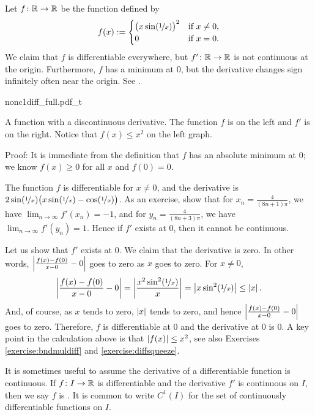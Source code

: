 \begin{example} \label{baddifffunc:example}
Let $f \colon {\mathbb{R}} \to {\mathbb{R}}$ be the function defined by
\begin{equation*}
f(x) :=
\begin{cases}
{\bigl( x \sin(\nicefrac{1}{x}) \bigr)}^2 & \text{if } x \not= 0, \\
0 & \text{if } x = 0.
\end{cases}
\end{equation*}
We claim that $f$ is differentiable everywhere, but
$f' \colon {\mathbb{R}} \to {\mathbb{R}}$ is not continuous at
the origin.  Furthermore, $f$ has a minimum at $0$, but the derivative
changes sign infinitely often near the origin.
See .
\begin{myfigureht}
{nonc1diff_full.pdf_t}
\caption{A function with a discontinuous derivative. The function $f$ is on the left
and $f'$ is on the right.  Notice that $f(x) \leq x^2$ on the left graph.\label{fig:nonc1diff}}
\end{myfigureht}

Proof: It is immediate from the definition that $f$ has an absolute
minimum at $0$; we know $f(x) \geq 0$ for all $x$ and $f(0) = 0$.

The function $f$ is differentiable for $x\not=0$,
and
the derivative 
is $2 \sin (\nicefrac{1}{x}) \bigl( x \sin (\nicefrac{1}{x}) -
\cos(\nicefrac{1}{x}) \bigr)$.
As an exercise, show that for $x_n = \frac{4}{(8n+1)\pi}$,
we have
$\lim_{n\to\infty} f'(x_n) = -1$, and for
$y_n = \frac{4}{(8n+3)\pi}$, we have
$\lim_{n\to\infty} f'(y_n) = 1$.  Hence if $f'$ exists at $0$,
then it cannot be continuous.

Let us show that $f'$ exists at $0$.  We claim that the derivative is zero.
In other words, $\left\lvert {\frac{f(x)-f(0)}{x-0} - 0} \right\rvert$ goes to zero
as $x$ goes to zero.  For $x \not= 0$,
\begin{equation*}
\left\lvert {\frac{f(x)-f(0)}{x-0} - 0} \right\rvert
=
\left\lvert {\frac{x^2 \sin^2(\nicefrac{1}{x})}{x}} \right\rvert
=
\left\lvert {x \sin^2(\nicefrac{1}{x})} \right\rvert
\leq
\left\lvert {x} \right\rvert .
\end{equation*}
And, of course, as $x$ tends to zero, $\left\lvert {x} \right\rvert$ tends to zero, and hence
$\left\lvert {\frac{f(x)-f(0)}{x-0} - 0} \right\rvert$ goes to zero.  Therefore, $f$
is differentiable at 0 and the derivative at 0 is 0.
A key point in the calculation above
is that $\left\lvert {f(x)} \right\rvert \leq x^2$,
see also Exercises \ref{exercise:bndmuldiff} and
\ref{exercise:diffsqueeze}.
\end{example}

It is sometimes useful to assume the derivative of a differentiable
function is continuous.  If $f \colon I \to {\mathbb{R}}$ is differentiable and
the derivative $f'$ is continuous on $I$, then we say $f$ is
\emph{}.  It is common to
write $C^1(I)$ for the set of continuously differentiable functions on $I$.

